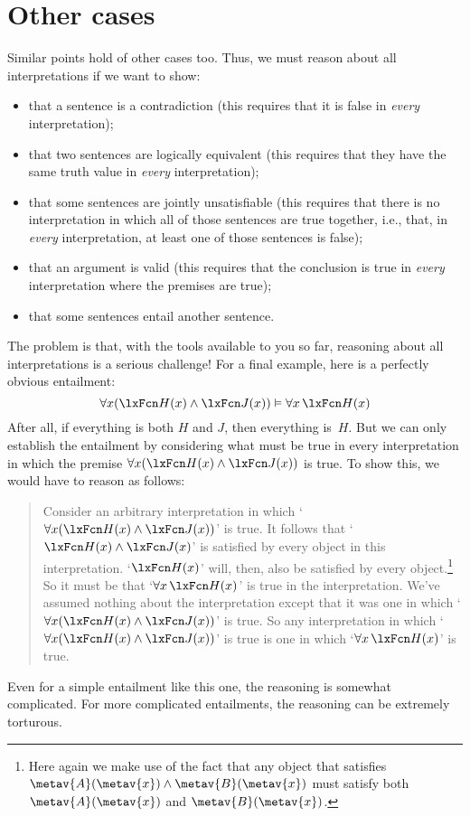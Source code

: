 \section{Other cases}
Similar points hold of other cases too. Thus, we must reason about all interpretations if we want to show:
	\begin{itemize}
		\item that a sentence is a contradiction (this requires that it is false in \emph{every} interpretation);
		\item that two sentences are logically equivalent (this requires that they have the same truth value in \emph{every} interpretation);
		\item that some sentences are jointly unsatisfiable (this requires that there is no interpretation in which all of those sentences are true together, i.e., that, in \emph{every} interpretation, at  least one of those sentences is false);
		\item that an argument is valid (this requires that the conclusion is true in \emph{every} interpretation where the premises are true);
		\item that some sentences entail another sentence.
	\end{itemize}
The problem is that, with the tools available to you so far, reasoning about all interpretations is a serious challenge! For a final example, here is a perfectly obvious entailment:
	$$\forall x(\atom{H}{x} \eand \atom{J}{x}) \entails \forall x\, \atom{H}{x}$$
After all, if everything is both $H$ and $J$, then everything is~$H$.
But we can only establish the entailment by considering what must be
true in every interpretation in which the premise $\forall
x(\atom{H}{x} \eand \atom{J}{x})$ is true. To show this, we would have
to reason as follows:
	\begin{quote}
		Consider an arbitrary interpretation in which `$\forall x(\atom{H}{x} \eand \atom{J}{x})$' is true. It follows that `$\atom{H}{x} \eand \atom{J}{x}$' is satisfied by every object in this interpretation. `$\atom{H}{x}$' will, then, also be satisfied by every object.\footnote{Here again we make use of the fact that any object that satisfies $\metav{A}(\metav{x}) \land \metav{B}(\metav{x})$ must satisfy both $\metav{A}(\metav{x})$ and $\metav{B}(\metav{x})$.} So it must be that `$\forall x\, \atom{H}{x}$' is true in the  interpretation. We've assumed nothing about the interpretation except that it was one in which `$\forall x(\atom{H}{x} \eand \atom{J}{x})$' is true. So any interpretation in which `$\forall x(\atom{H}{x} \eand \atom{J}{x})$' is true is one in which `$\forall x\, \atom{H}{x}$' is true.
\end{quote}
Even for a simple entailment like this one, the reasoning is somewhat complicated. For more complicated entailments, the reasoning can be extremely torturous.

